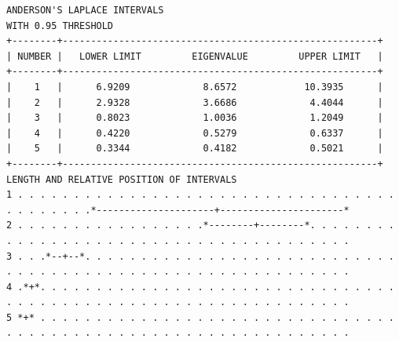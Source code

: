 \documentclass[a4paper,10pt,twocolumn]{article}
\begin{document}
\begin{landscape}
\begin{verbatim}
ANDERSON'S LAPLACE INTERVALS
WITH 0.95 THRESHOLD
+--------+--------------------------------------------------------+
| NUMBER |   LOWER LIMIT         EIGENVALUE         UPPER LIMIT   |
+--------+--------------------------------------------------------+
|    1   |      6.9209             8.6572            10.3935      |
|    2   |      2.9328             3.6686             4.4044      |
|    3   |      0.8023             1.0036             1.2049      |
|    4   |      0.4220             0.5279             0.6337      |
|    5   |      0.3344             0.4182             0.5021      |
+--------+--------------------------------------------------------+
LENGTH AND RELATIVE POSITION OF INTERVALS
1 . . . . . . . . . . . . . . . . . . . . . . . . . . . . . . . . . . . . . . . . . .*---------------------+----------------------*
2 . . . . . . . . . . . . . . . . .*--------+--------*. . . . . . . . . . . . . . . . . . . . . . . . . . . . . . . . . . . . . . .
3 . . .*--+--*. . . . . . . . . . . . . . . . . . . . . . . . . . . . . . . . . . . . . . . . . . . . . . . . . . . . . . . . . . .
4 .*+*. . . . . . . . . . . . . . . . . . . . . . . . . . . . . . . . . . . . . . . . . . . . . . . . . . . . . . . . . . . . . . .
5 *+* . . . . . . . . . . . . . . . . . . . . . . . . . . . . . . . . . . . . . . . . . . . . . . . . . . . . . . . . . . . . . . .



\end{verbatim}
\end{landscape}
\end{document}
